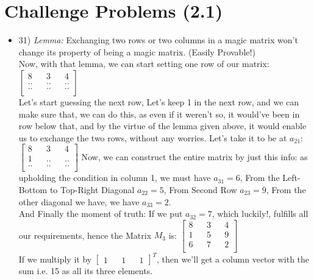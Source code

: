 \documentclass{article}
\begin{document}
\section{Challenge Problems (2.1)}
\begin{itemize}
  \item 31) \textit{Lemma: } Exchanging two rows or two columns in a magic matrix won't change its property of being a magic matrix. (Easily Provable!) \\
  Now, with that lemma, we can start setting one row of our matrix: \\
  $\begin{bmatrix}
    8 && 3 && 4 \\
    ..  && .. && .. \\
    .. && .. && .. \\
  \end{bmatrix}$
  \\ Let's start guessing the next row, Let's keep 1 in the next row, and we can make sure that, we can do this, as even if it weren't so, it would've been in row below that, and by the virtue of the lemma given above, it would enable us to exchange the two rows, without any worries. Let's take it to be at $a_{21}$:
  \\
  $\begin{bmatrix}
    8 && 3 && 4 \\
    1  && .. && .. \\
    .. && .. && .. \\
  \end{bmatrix}$
  Now, we can construct the entire matrix by just this info: as upholding the condition in column 1, we must have $a_{31} = 6$, From the Left-Bottom to Top-Right Diagonal $a_{22} = 5$, From Second Row $a_{23} = 9$,
  From the other diagonal we have, we have $a_{33} = 2$.
  \\And Finally the moment of truth: If we put $a_{32} = 7$, which luckily!, fulfills all our requirements, hence the Matrix $M_3$ is:
  $\begin{bmatrix}
    8 && 3 && 4 \\
    1  && 5 && 9 \\
    6 && 7 && 2 \\
  \end{bmatrix}$
  \\If we multiply it by $\begin{bmatrix}1 && 1 && 1\end{bmatrix}^{T}$, then we'll get a column vector with the sum i.e. 15 as all its three elements.\\


\end{itemize}
\end{document}
